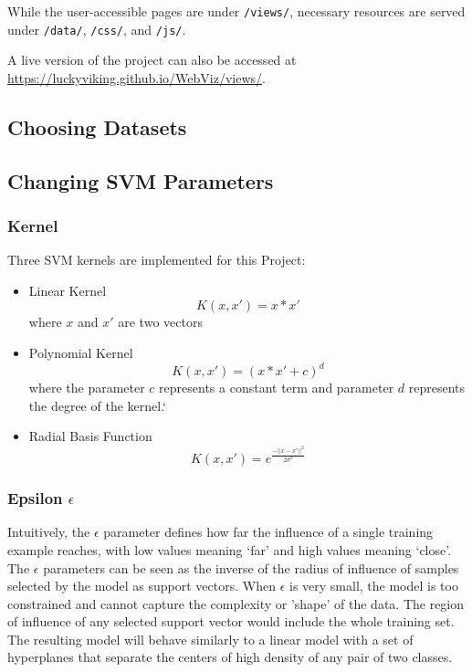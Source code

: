 \documentclass{scrartcl}
\begin{document}
While the user-accessible pages are under \verb|/views/|,
necessary resources are served under
\verb|/data/|, \verb|/css/|, and \verb|/js/|.

A live version of the project can also be accessed at
\url{https://luckyviking.github.io/WebViz/views/}.

\subsection{Choosing Datasets}


\subsection{Changing SVM Parameters}

\subsubsection*{Kernel}
Three SVM kernels are implemented for this Project:
\begin{itemize}
	\item Linear Kernel \[K(x,x') = x*x'\] where $x$ and $x'$ are two vectors
	\item Polynomial Kernel \[K(x,x') = (x*x' + c)^d\] where the parameter $c$ represents a constant term and parameter $d$ represents the degree of the kernel.`
	\item Radial Basis Function \[K(x,x') = e^{\frac{-||x-x'||^{2}}{2\sigma^2} }\]
\end{itemize}

\subsubsection*{Epsilon $\epsilon$}
Intuitively, the $\epsilon$ parameter defines how far the influence of a single training example reaches, with low values meaning ‘far’ and high values meaning ‘close’. The $\epsilon$ parameters can be seen as the inverse of the radius of influence of samples selected by the model as support vectors. When $\epsilon$ is very small, the model is too constrained and cannot capture the complexity or 'shape' of the data. The region of influence of any selected support vector would include the whole training set. The resulting model will behave similarly to a linear model with a set of hyperplanes that separate the centers of high density of any pair of two classes. 
\end{document}

